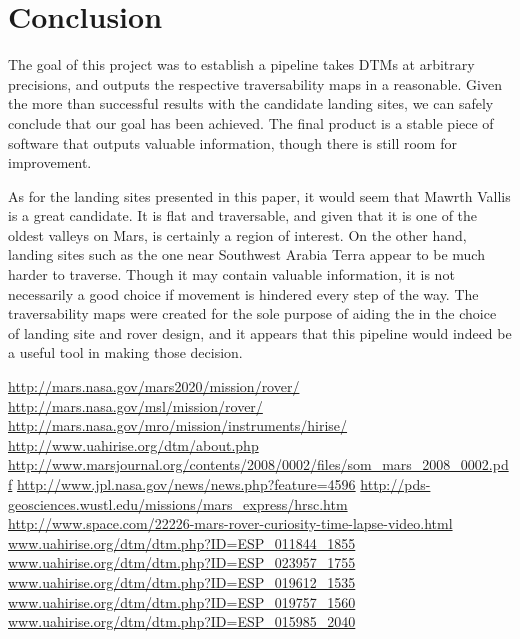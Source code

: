\documentclass[12pt]{article}
\begin{document}
\section{Conclusion}
\label{sec:conclusion}
\par The goal of this project was to establish a pipeline takes DTMs at arbitrary precisions, and outputs the respective traversability maps in a reasonable. Given the more than successful results with the candidate landing sites, we can safely conclude that our goal has been achieved. The final product is a stable piece of software that outputs valuable information, though there is still room for improvement.
\par As for the landing sites presented in this paper, it would seem that Mawrth Vallis is a great candidate. It is flat and traversable, and given that it is one of the oldest valleys on Mars, is certainly a region of interest. On the other hand, landing sites such as the one near Southwest Arabia Terra appear to be much harder to traverse. Though it may contain valuable information, it is not necessarily a good choice if movement is hindered every step of the way. The traversability maps were created for the sole purpose of aiding the in the choice of landing site and rover design, and it appears that this pipeline would indeed be a useful tool in making those decision.

\clearpage
\begin{thebibliography}{30}
  \url{http://mars.nasa.gov/mars2020/mission/rover/}
  \url{http://mars.nasa.gov/msl/mission/rover/}
  \url{http://mars.nasa.gov/mro/mission/instruments/hirise/}
  \url{http://www.uahirise.org/dtm/about.php}
  \url{http://www.marsjournal.org/contents/2008/0002/files/som_mars_2008_0002.pdf}
  \url{http://www.jpl.nasa.gov/news/news.php?feature=4596}
  \url{http://pds-geosciences.wustl.edu/missions/mars_express/hrsc.htm}
  \url{http://www.space.com/22226-mars-rover-curiosity-time-lapse-video.html}
  \url{www.uahirise.org/dtm/dtm.php?ID=ESP_011844_1855}
  \url{www.uahirise.org/dtm/dtm.php?ID=ESP_023957_1755}
  \url{www.uahirise.org/dtm/dtm.php?ID=ESP_019612_1535}
  \url{www.uahirise.org/dtm/dtm.php?ID=ESP_019757_1560}
  \url{www.uahirise.org/dtm/dtm.php?ID=ESP_015985_2040}
\end{thebibliography}
\end{document}
